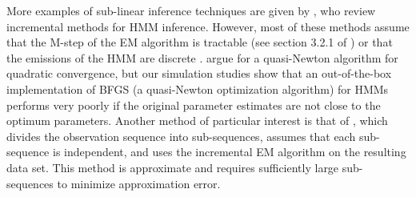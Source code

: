 More examples of sub-linear inference techniques are given by \citet{Khreich:2012}, who review incremental methods for HMM inference. However, most of these methods assume that the M-step of the EM algorithm is tractable (see section 3.2.1 of \citet{Khreich:2012}) or that the emissions of the HMM are discrete \citep{Baldi:1994}. \citep{Cappe:1998} argue for a quasi-Newton algorithm for quadratic convergence, but our simulation studies show that an out-of-the-box implementation of BFGS (a quasi-Newton optimization algorithm) for HMMs performs very poorly if the original parameter estimates are not close to the optimum parameters. Another method of particular interest is that of \citet{Gotoh:1998}, which divides the observation sequence into sub-sequences, assumes that each sub-sequence is independent, and uses the incremental EM algorithm on the resulting data set. This method is approximate and requires sufficiently large sub-sequences to minimize approximation error.




